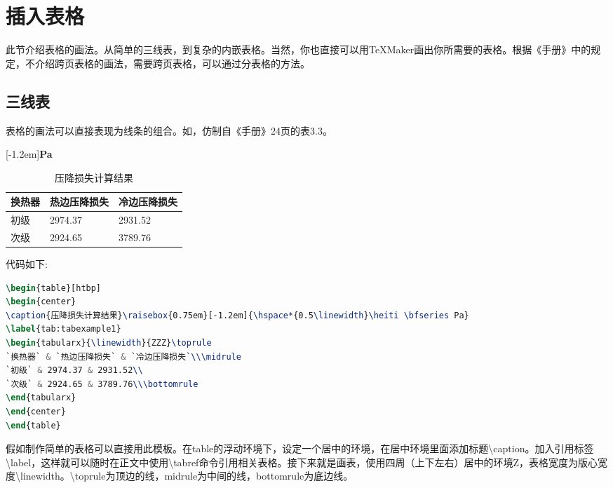 \section{插入表格}
此节介绍表格的画法。从简单的三线表，到复杂的内嵌表格。当然，你也直接可以用\TeX{}Maker画出你所需要的表格。根据《手册》中的规定，不介绍跨页表格的画法，需要跨页表格，可以通过分表格的方法。

\subsection{三线表}
表格的画法可以直接表现为线条的组合。如，仿制自《手册》24页的表3.3。

\begin{table}[htbp]
\begin{center}
\caption{压降损失计算结果}\raisebox{0.75em}[-1.2em]{\hspace*{0.5\linewidth}\heiti \bfseries Pa}
\label{tab:tabexample1}
\begin{tabularx}{\linewidth}{ZZZ}\toprule
换热器 & 热边压降损失 & 冷边压降损失\\\midrule
初级 & 2974.37 & 2931.52\\
次级 & 2924.65 & 3789.76\\\bottomrule
\end{tabularx}
\end{center}
\end{table}

代码如下:

\begin{lstlisting}[language=TeX]
\begin{table}[htbp]
\begin{center}
\caption{压降损失计算结果}\raisebox{0.75em}[-1.2em]{\hspace*{0.5\linewidth}\heiti \bfseries Pa}
\label{tab:tabexample1}
\begin{tabularx}{\linewidth}{ZZZ}\toprule
`换热器` & `热边压降损失` & `冷边压降损失`\\\midrule
`初级` & 2974.37 & 2931.52\\
`次级` & 2924.65 & 3789.76\\\bottomrule
\end{tabularx}
\end{center}
\end{table}
\end{lstlisting}

假如制作简单的表格可以直接用此模板。在table的浮动环境下，设定一个居中的环境，在居中环境里面添加标题\textbackslash caption。加入引用标签\textbackslash label，这样就可以随时在正文中使用\textbackslash tabref命令引用相关表格。接下来就是画表，使用四周（上下左右）居中的环境Z，表格宽度为版心宽度\textbackslash linewidth。\textbackslash toprule为顶边的线，midrule为中间的线，bottomrule为底边线。

